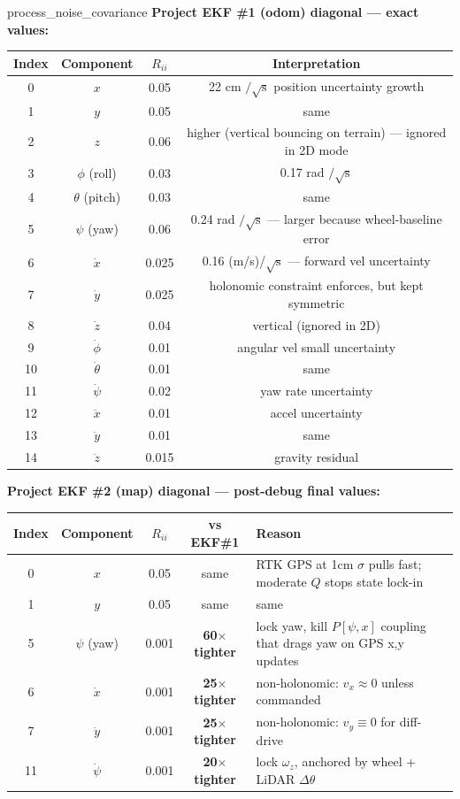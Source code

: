 \documentclass[11pt,a4paper]{article}
\begin{document}
\begin{paramcard}{process\_noise\_covariance}
\textbf{Project EKF \#1 (odom) diagonal --- exact values:}
\begin{center}
\footnotesize
\begin{tabular}{cccc}
\toprule
Index & Component & $R_{ii}$ & Interpretation \\
\midrule
0 & $x$ & 0.05 & 22 cm $/\sqrt{\text{s}}$ position uncertainty growth \\
1 & $y$ & 0.05 & same \\
2 & $z$ & 0.06 & higher (vertical bouncing on terrain) --- ignored in 2D mode \\
3 & $\phi$ (roll) & 0.03 & 0.17 rad $/\sqrt{\text{s}}$ \\
4 & $\theta$ (pitch) & 0.03 & same \\
5 & $\psi$ (yaw) & 0.06 & 0.24 rad $/\sqrt{\text{s}}$ --- larger because wheel-baseline error \\
6 & $\dot{x}$ & 0.025 & 0.16 (m/s)/$\sqrt{\text{s}}$ --- forward vel uncertainty \\
7 & $\dot{y}$ & 0.025 & holonomic constraint enforces, but kept symmetric \\
8 & $\dot{z}$ & 0.04 & vertical (ignored in 2D) \\
9 & $\dot{\phi}$ & 0.01 & angular vel small uncertainty \\
10 & $\dot{\theta}$ & 0.01 & same \\
11 & $\dot{\psi}$ & 0.02 & yaw rate uncertainty \\
12 & $\ddot{x}$ & 0.01 & accel uncertainty \\
13 & $\ddot{y}$ & 0.01 & same \\
14 & $\ddot{z}$ & 0.015 & gravity residual \\
\bottomrule
\end{tabular}
\end{center}

\textbf{Project EKF \#2 (map) diagonal --- post-debug final values:}
\begin{center}
\footnotesize
\begin{tabular}{ccccp{4.7cm}}
\toprule
Index & Component & $R_{ii}$ & vs EKF\#1 & Reason \\
\midrule
0  & $x$           & 0.05  & same  & RTK GPS at 1cm $\sigma$ pulls fast; moderate $Q$ stops state lock-in \\
1  & $y$           & 0.05  & same  & same \\
5  & $\psi$ (yaw)  & 0.001 & \textbf{60$\times$ tighter} & lock yaw, kill $P[\psi,x]$ coupling that drags yaw on GPS x,y updates \\
6  & $\dot{x}$     & 0.001 & \textbf{25$\times$ tighter} & non-holonomic: $v_x \approx 0$ unless commanded \\
7  & $\dot{y}$     & 0.001 & \textbf{25$\times$ tighter} & non-holonomic: $v_y \equiv 0$ for diff-drive \\
11 & $\dot{\psi}$  & 0.001 & \textbf{20$\times$ tighter} & lock $\omega_z$, anchored by wheel + LiDAR $\Delta\theta$ \\
\bottomrule
\end{tabular}
\end{center}


\end{paramcard}
\end{document}
